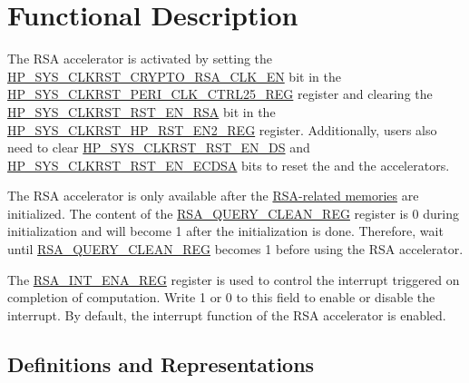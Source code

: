 \documentclass[main\_\_EN.tex]{subfiles}
\begin{document}
\section{Functional Description}\label{sec:rsa-func-desc}

The RSA accelerator is activated by setting the \hyperref[fielddesc:HPSYSCLKRSTCRYPTORSACLKEN]{HP\_SYS\_CLKRST\_CRYPTO\_RSA\_CLK\_EN} bit in the \hyperref[regdesc:HPSYSCLKRSTPERICLKCTRL25REG]{HP\_SYS\_CLKRST\_PERI\_CLK\_CTRL25\_REG} register and clearing the \hyperref[fielddesc:HPSYSCLKRSTRSTENRSA]{HP\_SYS\_CLKRST\_RST\_EN\_RSA} bit in the \hyperref[regdesc:HPSYSCLKRSTHPRSTEN2REG]{HP\_SYS\_CLKRST\_HP\_RST\_EN2\_REG} register. Additionally, users also need to clear \hyperref[fielddesc:HPSYSCLKRSTRSTENDS]{HP\_SYS\_CLKRST\_RST\_EN\_DS} and \hyperref[fielddesc:HPSYSCLKRSTRSTENECDSA]{HP\_SYS\_CLKRST\_RST\_EN\_ECDSA}  bits to reset the  and the  accelerators.

The RSA accelerator is only available after the \hyperref[sec:mem-sum]{RSA-related memories} are initialized. The content of the \hyperref[regdesc:RSAQUERYCLEANREG]{RSA\_QUERY\_CLEAN\_REG} register is 0 during initialization and will become 1 after the initialization is done. Therefore, wait until \hyperref[regdesc:RSAQUERYCLEANREG]{RSA\_QUERY\_CLEAN\_REG} becomes 1 before using the RSA accelerator.

The \hyperref[regdesc:RSAINTENAREG]{RSA\_INT\_ENA\_REG} register is used to control the interrupt triggered on completion of computation. Write 1 or 0 to this field to enable or disable the interrupt. By default, the interrupt function of the RSA accelerator is enabled.

\begin{importantlisting}
\vspace{-0.5em}

\end{importantlisting}

\subsection{Definitions and Representations} \label{sec:rsa-definitions-representations}
\end{document}
